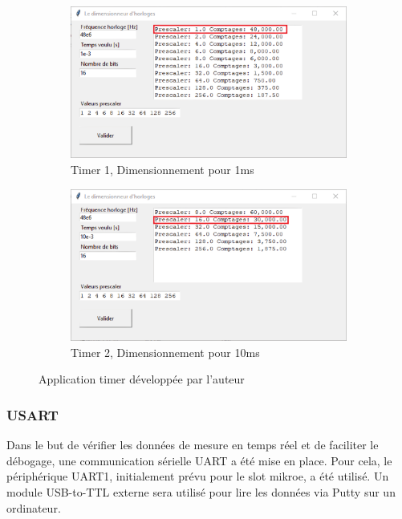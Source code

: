 {	\begin{figure}[h]
		\centering
		\begin{subfigure}[b]{0.45\textwidth}
			\centering
			\includegraphics[width=\textwidth]{Figures/Dev-SOFT/Timer1ms}
			\caption{Timer 1, Dimensionnement pour 1ms}
			\label{fig:timer1ms}
		\end{subfigure}
		\hfill
		\begin{subfigure}[b]{0.45\textwidth}
			\centering
			\includegraphics[width=\textwidth]{Figures/Dev-SOFT/Timer10ms}
			\caption{Timer 2, Dimensionnement pour 10ms}
			\label{fig:timer10ms}
		\end{subfigure}
		\hfill
		\caption{Application timer développée par l'auteur}
		\label{fig:appTimer}
	\end{figure}

	\clearpage

	\subsubsection{USART} \label{ssec:Usart}
	Dans le but de vérifier les données de mesure en temps réel et de faciliter le débogage, une communication sérielle UART a été mise en place. Pour cela, le périphérique UART1, initialement prévu pour le slot mikroe, a été utilisé. Un module USB-to-TTL externe sera utilisé pour lire les données via Putty sur un ordinateur.
	
}
